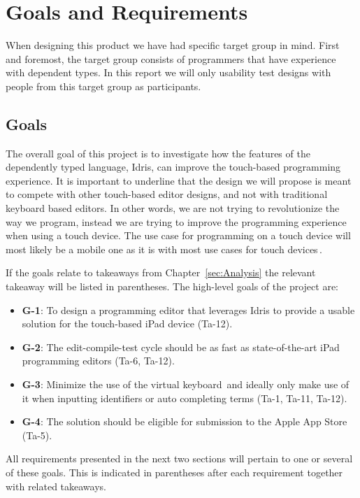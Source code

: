 \chapter{Goals and Requirements}
\label{sec:GoalsAndRequirements}
When designing this product we have had specific target group in mind. 
First and foremost, the target group consists of programmers that have experience with dependent
types. In this report we will only usability test designs with people from this
target group as participants.

\section{Goals}
\label{sec:Goals}
The overall goal of this project is to investigate how the features of the dependently typed language, Idris, can improve the touch-based programming experience. 
It is important to underline that the design we will propose is meant to compete with other touch-based editor designs, and not with traditional keyboard based editors.
In other words, we are not trying to revolutionize the way we program, instead we are trying to improve the programming experience when using a touch device.
The use case for programming on a touch device will most likely be a mobile one as it is with most use cases for touch devices\,\cite[p. 26]{nielsen2013mobile}.

If the goals relate to takeaways from Chapter~\ref{sec:Analysis} the relevant takeaway will be listed in parentheses. The high-level goals of the project are:

\begin{itemize} 
	\item \textbf{G-1}: To design a programming editor that leverages Idris to provide a usable solution for the touch-based iPad device
	(Ta-12).
	\item \textbf{G-2}: The edit-compile-test cycle should be as fast as state-of-the-art iPad programming editors
	(Ta-6, Ta-12).
	\item \textbf{G-3}: Minimize the use of the virtual keyboard\,\cite[pp. 76]{nielsen2013mobile} and ideally only make use of it when inputting identifiers or auto completing terms
	(Ta-1, Ta-11, Ta-12).
	\item \textbf{G-4}: The solution should be eligible for submission to the Apple App Store (Ta-5). 
\end{itemize}

All requirements presented in the next two sections will pertain to one or
several of these goals. This is indicated in parentheses after each requirement
together with related takeaways.


